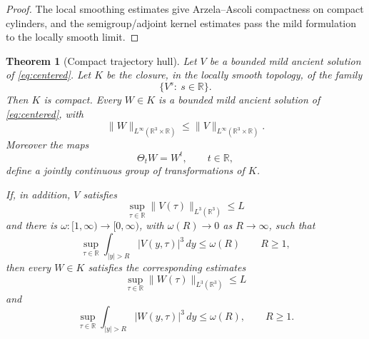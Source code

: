 \documentclass[11pt]{amsart}
\theoremstyle{plain}
\newtheorem{theorem}{Theorem}[section]
\theoremstyle{definition}
\theoremstyle{remark}
\numberwithin{equation}{section}
\begin{document}
\begin{proof}
The local smoothing estimates give Arzela--Ascoli compactness on compact
cylinders, and the semigroup/adjoint kernel estimates pass the mild formulation
to the locally smooth limit.
\end{proof}

\begin{theorem}[Compact trajectory hull]\label{thm:compact-hull}
Let \(V\) be a bounded mild ancient solution of \eqref{eq:centered}.  Let \(K\)
be the closure, in the locally smooth topology, of the family
\[
   \{V^s:\ s\in\mathbb R\}.
\]
Then \(K\) is compact.  Every \(W\in K\) is a bounded mild ancient solution of
\eqref{eq:centered}, with
\[
   \|W\|_{L^\infty(\mathbb R^3\times\mathbb R)}
   \le
   \|V\|_{L^\infty(\mathbb R^3\times\mathbb R)}.
\]
Moreover the maps
\[
   \Theta_t W=W^t,\qquad t\in\mathbb R,
\]
define a jointly continuous group of transformations of \(K\).

If, in addition, \(V\) satisfies
\begin{equation}\label{eq:L3-tight}
   \sup_{\tau\in\mathbb R}\|V(\tau)\|_{L^3(\mathbb R^3)}\le L
\end{equation}
and there is \(\omega:[1,\infty)\to[0,\infty)\), with
\(\omega(R)\to0\) as \(R\to\infty\), such that
\begin{equation}\label{eq:tail}
   \sup_{\tau\in\mathbb R}
   \int_{|y|>R}|V(y,\tau)|^3\,dy\le\omega(R)
   \qquad R\ge1,
\end{equation}
then every \(W\in K\) satisfies the corresponding estimates
\[
   \sup_{\tau\in\mathbb R}\|W(\tau)\|_{L^3(\mathbb R^3)}\le L
\]
and
\[
   \sup_{\tau\in\mathbb R}
   \int_{|y|>R}|W(y,\tau)|^3\,dy\le\omega(R),
   \qquad R\ge1 .
\]
\end{theorem}
\end{document}
